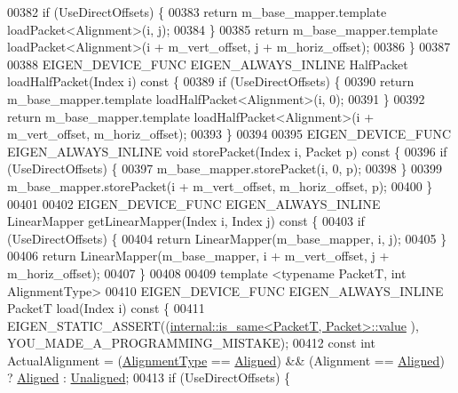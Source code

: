 \begin{DoxyCode}
00382     \textcolor{keywordflow}{if} (UseDirectOffsets) \{
00383       \textcolor{keywordflow}{return} m\_base\_mapper.template loadPacket<Alignment>(i, j);
00384     \}
00385     \textcolor{keywordflow}{return} m\_base\_mapper.template loadPacket<Alignment>(i + m\_vert\_offset, j + m\_horiz\_offset);
00386   \}
00387 
00388   EIGEN\_DEVICE\_FUNC EIGEN\_ALWAYS\_INLINE HalfPacket loadHalfPacket(Index i)\textcolor{keyword}{ const }\{
00389     \textcolor{keywordflow}{if} (UseDirectOffsets) \{
00390       \textcolor{keywordflow}{return} m\_base\_mapper.template loadHalfPacket<Alignment>(i, 0);
00391     \}
00392     \textcolor{keywordflow}{return} m\_base\_mapper.template loadHalfPacket<Alignment>(i + m\_vert\_offset, m\_horiz\_offset);
00393   \}
00394 
00395   EIGEN\_DEVICE\_FUNC EIGEN\_ALWAYS\_INLINE \textcolor{keywordtype}{void} storePacket(Index i, Packet p)\textcolor{keyword}{ const }\{
00396     \textcolor{keywordflow}{if} (UseDirectOffsets) \{
00397       m\_base\_mapper.storePacket(i, 0, p);
00398     \}
00399     m\_base\_mapper.storePacket(i + m\_vert\_offset, m\_horiz\_offset, p);
00400   \}
00401 
00402   EIGEN\_DEVICE\_FUNC EIGEN\_ALWAYS\_INLINE LinearMapper getLinearMapper(Index i, Index j)\textcolor{keyword}{ const }\{
00403     \textcolor{keywordflow}{if} (UseDirectOffsets) \{
00404       \textcolor{keywordflow}{return} LinearMapper(m\_base\_mapper, i, j);
00405     \}
00406     \textcolor{keywordflow}{return} LinearMapper(m\_base\_mapper, i + m\_vert\_offset, j + m\_horiz\_offset);
00407   \}
00408 
00409   \textcolor{keyword}{template} <\textcolor{keyword}{typename} PacketT, \textcolor{keywordtype}{int} AlignmentType>
00410   EIGEN\_DEVICE\_FUNC EIGEN\_ALWAYS\_INLINE PacketT load(Index i)\textcolor{keyword}{ const }\{
00411     EIGEN\_STATIC\_ASSERT((\hyperlink{struct_eigen_1_1internal_1_1is__same}{internal::is\_same<PacketT, Packet>::value}
      ), YOU\_MADE\_A\_PROGRAMMING\_MISTAKE);
00412     \textcolor{keyword}{const} \textcolor{keywordtype}{int} ActualAlignment = (\hyperlink{group__enums_ga45fe06e29902b7a2773de05ba27b47a1}{AlignmentType} == \hyperlink{group__enums_gga45fe06e29902b7a2773de05ba27b47a1ad37d4c71425bb286e9b4103830538fbf}{Aligned}) && (Alignment == 
      \hyperlink{group__enums_gga45fe06e29902b7a2773de05ba27b47a1ad37d4c71425bb286e9b4103830538fbf}{Aligned}) ? \hyperlink{group__enums_gga45fe06e29902b7a2773de05ba27b47a1ad37d4c71425bb286e9b4103830538fbf}{Aligned} : \hyperlink{group__enums_gga45fe06e29902b7a2773de05ba27b47a1ac935220b4c844108e183ebe30a4d5204}{Unaligned};
00413     \textcolor{keywordflow}{if} (UseDirectOffsets) \{

\end{DoxyCode}
